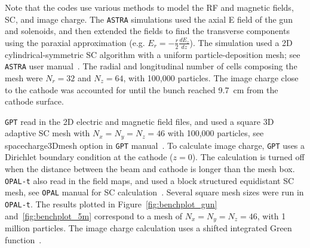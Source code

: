 Note that the codes use various methods to model 
the RF and magnetic fields, SC, and image charge. 
The \verb|ASTRA| simulations used the axial E field of the  
gun and solenoids, and then extended the fields to find the
transverse components using the paraxial approximation 
(e.g. $E_r=-\frac{r}{2}\frac{dE_z}{dz}$). 
The simulation used a 2D cylindrical-symmetric SC algorithm with a uniform  
particle-deposition mesh; see \verb|ASTRA| user manual~\cite{astra}.
The radial and longitudinal number of cells composing the mesh 
were $N_r=32$ and $N_z=64$, with 100,000 particles.  
The image charge close to the cathode was accounted for until 
the bunch reached \SI{9.7}{cm} from the cathode surface. 

\verb|GPT| read in the 2D electric and magnetic field files,  
and used a square 3D adaptive SC mesh with $N_x=N_y=N_z=46$
with 100,000 particles, see spacecharge3Dmesh option in \verb|GPT| manual~\cite{gpt}.
To calculate image charge, \verb|GPT| uses a Dirichlet boundary condition at the  
cathode ($z=0$). The calculation is turned off when the  
distance between the beam and cathode is longer than the 
mesh box. \verb|OPAL-t| also read in the field maps, and used a block 
structured equidistant SC mesh, see \verb|OPAL| manual for SC calculation~\cite{opal}.  
Several square mesh sizes were run in \verb|OPAL-t|. The results plotted in 
Figure~\ref{fig:benchplot_gun} and~\ref{fig:benchplot_5m} 
correspond to a mesh of $N_x=N_y=N_z=46$, with 1 million particles. 
The image charge calculation uses a 
shifted integrated Green function~\cite{imagecharge}.  
